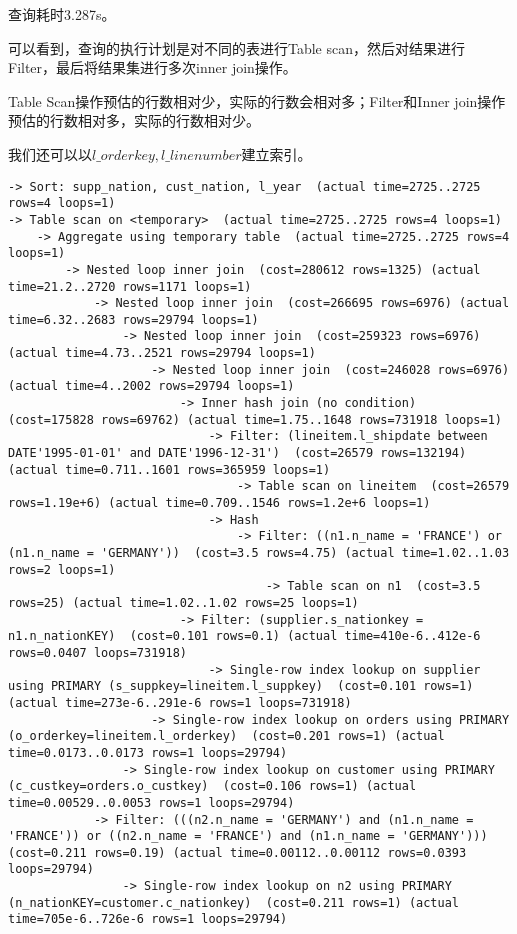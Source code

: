 \documentclass{article}
\begin{document}
查询耗时3.287s。

可以看到，查询的执行计划是对不同的表进行Table scan，然后对结果进行Filter，最后将结果集进行多次inner join操作。

Table Scan操作预估的行数相对少，实际的行数会相对多；Filter和Inner join操作预估的行数相对多，实际的行数相对少。

我们还可以以$l\_orderkey,l\_linenumber$建立索引。

\begin{lstlisting}
-> Sort: supp_nation, cust_nation, l_year  (actual time=2725..2725 rows=4 loops=1)
-> Table scan on <temporary>  (actual time=2725..2725 rows=4 loops=1)
    -> Aggregate using temporary table  (actual time=2725..2725 rows=4 loops=1)
        -> Nested loop inner join  (cost=280612 rows=1325) (actual time=21.2..2720 rows=1171 loops=1)
            -> Nested loop inner join  (cost=266695 rows=6976) (actual time=6.32..2683 rows=29794 loops=1)
                -> Nested loop inner join  (cost=259323 rows=6976) (actual time=4.73..2521 rows=29794 loops=1)
                    -> Nested loop inner join  (cost=246028 rows=6976) (actual time=4..2002 rows=29794 loops=1)
                        -> Inner hash join (no condition)  (cost=175828 rows=69762) (actual time=1.75..1648 rows=731918 loops=1)
                            -> Filter: (lineitem.l_shipdate between DATE'1995-01-01' and DATE'1996-12-31')  (cost=26579 rows=132194) (actual time=0.711..1601 rows=365959 loops=1)
                                -> Table scan on lineitem  (cost=26579 rows=1.19e+6) (actual time=0.709..1546 rows=1.2e+6 loops=1)
                            -> Hash
                                -> Filter: ((n1.n_name = 'FRANCE') or (n1.n_name = 'GERMANY'))  (cost=3.5 rows=4.75) (actual time=1.02..1.03 rows=2 loops=1)
                                    -> Table scan on n1  (cost=3.5 rows=25) (actual time=1.02..1.02 rows=25 loops=1)
                        -> Filter: (supplier.s_nationkey = n1.n_nationKEY)  (cost=0.101 rows=0.1) (actual time=410e-6..412e-6 rows=0.0407 loops=731918)
                            -> Single-row index lookup on supplier using PRIMARY (s_suppkey=lineitem.l_suppkey)  (cost=0.101 rows=1) (actual time=273e-6..291e-6 rows=1 loops=731918)
                    -> Single-row index lookup on orders using PRIMARY (o_orderkey=lineitem.l_orderkey)  (cost=0.201 rows=1) (actual time=0.0173..0.0173 rows=1 loops=29794)
                -> Single-row index lookup on customer using PRIMARY (c_custkey=orders.o_custkey)  (cost=0.106 rows=1) (actual time=0.00529..0.0053 rows=1 loops=29794)
            -> Filter: (((n2.n_name = 'GERMANY') and (n1.n_name = 'FRANCE')) or ((n2.n_name = 'FRANCE') and (n1.n_name = 'GERMANY')))  (cost=0.211 rows=0.19) (actual time=0.00112..0.00112 rows=0.0393 loops=29794)
                -> Single-row index lookup on n2 using PRIMARY (n_nationKEY=customer.c_nationkey)  (cost=0.211 rows=1) (actual time=705e-6..726e-6 rows=1 loops=29794)
\end{lstlisting}
\end{document}
